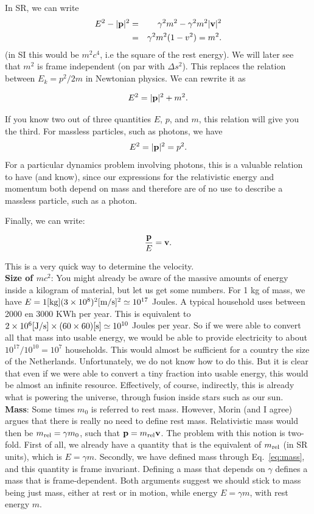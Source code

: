 \documentclass[12pt]{article}
\newcommand{\be}{\begin{eqnarray}}
\newcommand{\ee}{\end{eqnarray}}
\begin{document}
In SR, we can write 
\be
E^2 - |{\bf p}|^2 &=& \gamma^2 m^2 - \gamma^2 m ^2 |{\bf v}|^2 \nonumber \\
&=& \gamma^2 m^2(1-v^2) = m^2. \label{eq:mass}
\ee
(in SI this would be $m^2 c^4$, i.e the square of the rest energy). We will later see that $m^2$ is frame independent (on par with $\Delta s^2$). This replaces the relation between $E_k = p^2/2m$ in Newtonian physics. We can rewrite it as 
\begin{tcolorbox}[colback=blue!5!white]
\vspace{-1.3em}
\be
E^2 = |{\bf p}|^2+ m^2.
\ee
\end{tcolorbox}
If you know two out of three quantities $E$, $p$, and $m$, this relation will give you the third. For massless particles, such as photons, we have 
\be
E^2  = |{\bf p}|^2 = p^2.
\ee
For a particular dynamics problem involving photons, this is a valuable relation to have (and know), since our expressions for the relativistic energy and momentum both depend on mass and therefore are of no use to describe a massless particle, such as a photon. 

Finally, we can write:
\begin{tcolorbox}[colback=blue!5!white]
\vspace{-1.3em}
\be
\frac{\bf p}{E} = {\bf v}.
\ee
\end{tcolorbox}
This is a very quick way to determine the velocity. \\

\noindent
{\bf Size of $mc^2$}: You might already be aware of the massive amounts of energy inside a kilogram of material, but let us get some numbers. For 1 kg of mass, we have $E  = 1 [{\rm kg}] (3\times 10^8)^2 [{\rm m/s}]^2 \simeq 10^{17}$ Joules. A typical household uses between 2000 en 3000 KWh per year. This is equivalent to $2 \times 10^6 [{\rm J/s}] \times (60\times 60) [{\rm s}] \simeq 10^{10}$ Joules per year. So if we were able to convert all that mass into usable energy, we would be able to provide electricity to about $10^{17}/10^{10} = 10^7$ households. This would almost be sufficient for a country the size of the Netherlands. Unfortunately, we do not know how to do this. But it is clear that even if we were able to convert a tiny fraction into usable energy, this would be almost an infinite resource. Effectively, of course, indirectly, this is already what is powering the universe, through fusion inside stars such as our sun.  \\ 

\noindent
{\bf Mass}: Some times $m_0$ is referred to rest mass. However, Morin (and I agree) argues that there is really no need to define rest mass. Relativistic mass would then be $m_{\rm rel} = \gamma m_0$, such that ${\bf p} = m_{\rm  rel}{\bf v}$. The problem with this notion is two-fold. First of all, we already have a quantity that is the equivalent of $m_{\rm rel}$ (in SR units), which is $E = \gamma m$. Secondly, we have defined mass through Eq.~\eqref{eq:mass}, and this quantity is frame invariant. Defining a mass that depends on $\gamma$ defines a mass that is frame-dependent. Both arguments suggest we should stick to mass being just mass, either at rest or in motion, while energy $E=\gamma m$, with rest energy $m$.   
\end{document}
